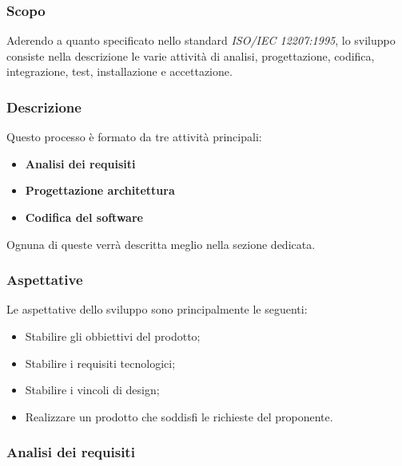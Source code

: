\documentclass[../norme_di_progetto.tex]{subfiles}
\begin{document}
\subsubsection{Scopo}
Aderendo a quanto specificato nello standard \emph{ISO/IEC  12207:1995}, lo sviluppo consiste nella descrizione le varie attività di analisi, progettazione, codifica, integrazione, test, installazione e accettazione.

\subsubsection{Descrizione}

Questo processo è formato da tre attività principali:
\begin{itemize}
    \item \textbf{Analisi dei requisiti}
    \item \textbf{Progettazione architettura}
    \item \textbf{Codifica del software}
\end{itemize}

Ognuna di queste verrà descritta meglio nella sezione dedicata.

\subsubsection{Aspettative}
Le aspettative dello sviluppo sono principalmente le seguenti:
\begin{itemize}

\item Stabilire gli obbiettivi del prodotto;
\item Stabilire i requisiti tecnologici;
\item Stabilire i vincoli di design;
\item Realizzare un prodotto che soddisfi le richieste del proponente.

\end{itemize}

\subsubsection{Analisi dei requisiti}
\end{document}
